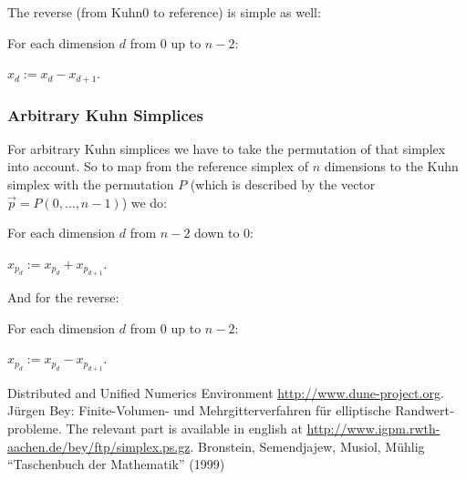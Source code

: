 \documentclass[english,a4paper]{article}
\begin{document}
The reverse (from Kuhn0 to reference) is simple as well:
\begin{compactitem}
\item For each dimension $d$ from 0 up to $n-2$:
  \begin{compactitem}
  \item $x_d:=x_d-x_{d+1}$.
  \end{compactitem}
\end{compactitem}

\subsubsection{Arbitrary Kuhn Simplices}

For arbitrary Kuhn simplices we have to take the permutation of that
simplex into account.  So to map from the reference simplex of $n$
dimensions to the Kuhn simplex with the permutation $P$ (which is
described by the vector $\vec{p}=P(0,\ldots,n-1)$) we do:
\begin{compactitem}
\item For each dimension $d$ from $n-2$ down to 0:
  \begin{compactitem}
  \item $x_{p_d}:=x_{p_d}+x_{p_{d+1}}$.
  \end{compactitem}
\end{compactitem}\vspace{2ex}

And for the reverse:
\begin{compactitem}
\item For each dimension $d$ from 0 up to $n-2$:
  \begin{compactitem}
  \item $x_{p_d}:=x_{p_d}-x_{p_{d+1}}$.
  \end{compactitem}
\end{compactitem}

\begin{thebibliography}{0}
 Distributed and Unified Numerics Environment
  \url{http://www.dune-project.org}.
 \foreignlanguage{ngerman}{J\"urgen Bey: Finite-Volumen-
    und Mehrgitterverfahren f\"ur elliptische Randwertprobleme.}  The
  relevant part is available in english at
  \url{http://www.igpm.rwth-aachen.de/bey/ftp/simplex.ps.gz}.
 Bronstein, Semendjajew, Musiol, M\"uhlig
  ``Taschenbuch der Mathematik'' (1999)

\end{thebibliography}
\end{document}
